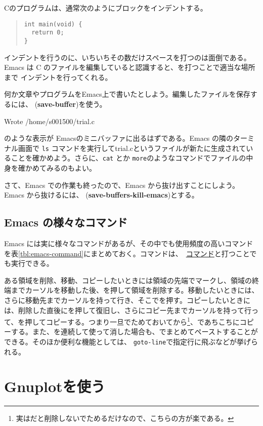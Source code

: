 Cのプログラムは、通常次のようにブロックをインデントする。
\begin{quote}
    \begin{verbatim}
int main(void) {
  return 0;
}
\end{verbatim}
\end{quote}
インデントを行うのに、いちいちその数だけスペースを打つのは面倒である。Emacs は C のファイルを編集していると認識すると、を打つことで適当な場所まで
インデントを行ってくれる。

何か文章やプログラムをEmacs上で書いたとしよう。編集したファイルを保存するには、  (\textbf{save-buffer})を使う。
\begin{commandline2}
    Wrote /home/s001500/trial.c
\end{commandline2} \noindent
のような表示が Emacsのミニバッファに出るはずである。Emacs の隣のターミナル画面で \texttt{ls} コマンドを実行してtrial.cというファイルが新たに生成されていることを確かめよう。さらに、\texttt{cat} とか \texttt{more}のようなコマンドでファイルの中身を確かめてみるのもよい。

さて、Emacs での作業も終ったので、Emacs から抜け出すことにしよう。Emacs から抜けるには、  (\textbf{save-buffers-kill-emacs})とする。

\subsection{Emacs の様々なコマンド}
Emacs には実に様々なコマンドがあるが、その中でも使用頻度の高いコマンドを表\ref{tbl:emacs-command}にまとめておく。コマンドは、\ \underline{コマンド}と打つことでも実行できる。

ある領域を削除、移動、コピーしたいときには領域の先端でマークし、領域の終端までカーソルを移動した後、を押して領域を削除する。移動したいときには、さらに移動先までカーソルを持って行き、そこでを押す。コピーしたいときには、削除した直後にを押して復旧し、さらにコピー先までカーソルを持って行って、を押してコピーする。つまり一旦でためておいてから\footnote{実はだと削除しないでためるだけなので、こちらの方が楽である。}、であちこちにコピーする。また、を連続して使って消した場合も、でまとめてペーストすることができる。そのほか便利な機能としては、 \texttt{goto-line}で指定行に飛ぶなどが挙げられる。

\section{Gnuplotを使う}
\label{sec:unix:gnuplot}

